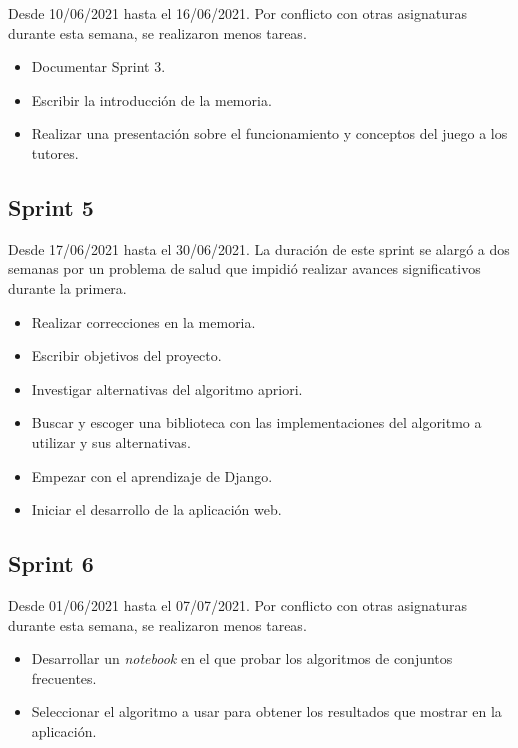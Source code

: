 Desde 10/06/2021 hasta el 16/06/2021. Por conflicto con otras asignaturas durante esta semana, se realizaron menos tareas.

\begin{itemize}
    \item Documentar Sprint 3.
    \item Escribir la introducción de la memoria.
    \item Realizar una presentación sobre el funcionamiento y conceptos del juego a los tutores.
\end{itemize}

\subsection{Sprint 5}

Desde 17/06/2021 hasta el 30/06/2021. La duración de este sprint se alargó a dos semanas por un problema de salud que impidió realizar avances significativos durante la primera.

\begin{itemize}
    \item Realizar correcciones en la memoria.
    \item Escribir objetivos del proyecto.
    \item Investigar alternativas del algoritmo apriori.
    \item Buscar y escoger una biblioteca con las implementaciones del algoritmo a utilizar y sus alternativas.
    \item Empezar con el aprendizaje de Django.
    \item Iniciar el desarrollo de la aplicación web.
\end{itemize}

\subsection{Sprint 6}

Desde 01/06/2021 hasta el 07/07/2021. Por conflicto con otras asignaturas durante esta semana, se realizaron menos tareas.

\begin{itemize}
    \item Desarrollar un \textit{notebook} en el que probar los algoritmos de conjuntos frecuentes.
    \item Seleccionar el algoritmo a usar para obtener los resultados que mostrar en la aplicación.
\end{itemize}

